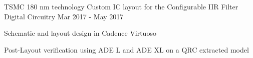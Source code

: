 \begin{cventries}

\cventry
{TSMC 180 nm technology} %
{Custom IC layout for the Configurable IIR Filter} %
{Digital Circuitry} %
{Mar 2017 - May 2017} %
{ %
\begin{cvitems}
    \item {Schematic and layout design in Cadence Virtuoso}
    \item {Post-Layout verification using ADE L and ADE XL on a QRC extracted model}
\end{cvitems}
}



\end{cventries}
